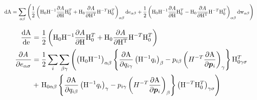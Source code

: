 \documentclass[11pt,a4paper,uplatex]{jsarticle}
\begin{document}
\begin{align}
    {\rm dA} &= \sum_{\alpha \beta} \left( 
    \frac{1}{2}\left({\rm H}_{0} {\rm H}^{-1} \frac{\partial A}{\partial {\rm H}} {\rm H}_{0}^{T} + {\rm H}_{0} \frac{\partial A}{\partial {\rm H^{T}}} {\rm H}^{-T}{\rm H}_{0}^{T}  \right)_{\alpha \beta} {\rm de}_{\alpha \beta}
     + \frac{1}{2}\left({\rm H}_{0} {\rm H}^{-1} \frac{\partial A}{\partial {\rm H}} {\rm H}_{0}^{T} - {\rm H}_{0} \frac{\partial A}{\partial {\rm H^{T}}} {\rm H}^{-T}{\rm H}_{0}^{T}  \right)_{\alpha \beta} {\rm dw}_{\alpha \beta} 
     \right)
\end{align}

\begin{align}
    \frac{\rm dA}{\rm de} &= \frac{1}{2}\left({\rm H}_{0} {\rm H}^{-1} \frac{\partial A}{\partial {\rm H}} {\rm H}_{0}^{T} + {\rm H}_{0} \frac{\partial A}{\partial {\rm H^{T}}} {\rm H}^{-T}{\rm H}_{0}^{T}  \right) \\
    \frac{\partial A}{\partial e_{\alpha \sigma}} &= \frac{1}{2} \sum_{i} \sum_{\beta \gamma} \left( \left({\rm H}_{0} {\rm H}^{-1}\right)_{\alpha \beta}
     \left\{ \frac{\partial {\rm A}}{\partial q_{i \gamma}} \left({\rm H}^{-1} q_{i}\right)_{\beta}    -  p_{i \beta} \left( H^{-T} \frac{\partial {\rm A}}{\partial \bm{p}_{i}}  \right)_{\gamma} \right\} {\rm H}_{0 \gamma \sigma} ^{T}\right. \\
    &+ \left. {\rm H}_{0 \alpha \beta}  \left\{ \frac{\partial {\rm A}}{\partial q_{i \beta}} \left({\rm H}^{-1} q_{i}\right)_{\gamma}  -  p_{i \gamma} \left( H^{-T} \frac{\partial {\rm A}}{\partial \bm{p}_{i}}  \right)_{\beta} \right\}   \left({\rm H}^{-T}{\rm H}_{0}^{T} \right)_{\gamma \sigma} \right) \\
\end{align}
\end{document}
